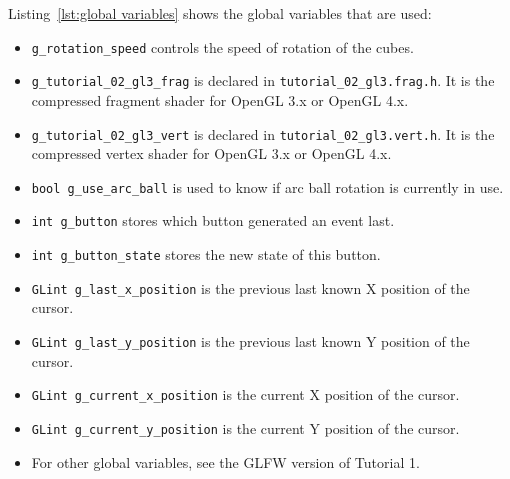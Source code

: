 \documentclass[11pt,oneside,a4paper,final]{article}
\begin{document}
Listing~\ref{lst:global variables} shows the global variables that are used:
\begin{itemize}

 \item \verb+g_rotation_speed+ controls the speed of rotation  of the cubes. 

% 

 \item \verb+g_tutorial_02_gl3_frag+  is declared in \verb+tutorial_02_gl3.frag.h+. 
 It is the compressed fragment shader for OpenGL 3.x or OpenGL 4.x.
 
 \item \verb+g_tutorial_02_gl3_vert+  is declared in \verb+tutorial_02_gl3.vert.h+. 
 It is the compressed vertex shader for OpenGL 3.x or OpenGL 4.x.

\item \verb+bool g_use_arc_ball+ is used to know if arc ball rotation is currently in use.

\item \verb+int g_button+ stores which button generated an event last.

\item \verb+int g_button_state+ stores the new state of this button.

\item \verb+GLint g_last_x_position+ is the previous last known X position of the cursor.

\item \verb+GLint g_last_y_position+ is the previous last known Y position of the cursor.

\item \verb+GLint g_current_x_position+ is the current X position of the cursor.

\item \verb+GLint g_current_y_position+ is the current Y position of the cursor.

	 \item For other global variables, see the GLFW version of Tutorial 1.
\end{itemize}


\begin{center}

\end{center}
\end{document}
